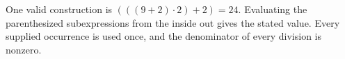One valid construction is $\boxed{(((9+2)\cdot 2)+2)=24}$. Evaluating the parenthesized subexpressions from the inside out gives the stated value. Every supplied occurrence is used once, and the denominator of every division is nonzero.
